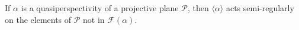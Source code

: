 If $\alpha$ is a quasiperspectivity of a projective plane $\mathcal{P}$, then $\langle\alpha\rangle$ acts semi-regularly on the elements of $\mathcal{P}$ not in $\mathcal{F}(\alpha)$.
